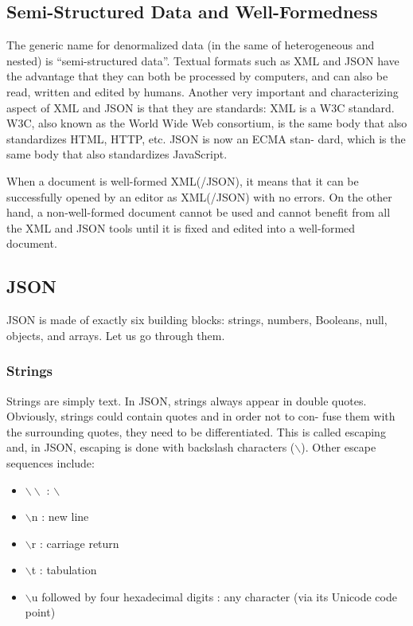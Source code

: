 \subsection{Semi-Structured Data and Well-Formedness}
The generic name for denormalized data (in the same of heterogeneous and nested) is “semi-structured data”. Textual formats such as XML and JSON have the advantage that they can both be processed by computers, and can also be read, written and edited by humans. Another very important and characterizing aspect of XML and JSON is that they are standards: XML is a W3C standard. W3C, also known as the World Wide Web consortium, is the same body that also standardizes HTML, HTTP, etc. JSON is now an ECMA stan- dard, which is the same body that also standardizes JavaScript.

When a document is well-formed XML(/JSON), it means that it can be successfully opened by an editor as XML(/JSON) with no errors. On the other hand, a non-well-formed document cannot be used and cannot benefit from all the XML and JSON tools until it is fixed and edited into a well-formed document.

\subsection{JSON}
JSON is made of exactly six building blocks: strings, numbers, Booleans, null, objects, and arrays. Let us go through them.

\subsubsection{Strings}
Strings are simply text. In JSON, strings always appear in double quotes. Obviously, strings could contain quotes and in order not to con- fuse them with the surrounding quotes, they need to be differentiated. This is called escaping and, in JSON, escaping is done with backslash characters ($\backslash$). Other escape sequences include:
\begin{itemize}
    \item $\backslash \backslash$ : $\backslash$
    \item $\backslash$n : new line
    \item $\backslash$r : carriage return
    \item $\backslash$t : tabulation
    \item $\backslash$u followed by four hexadecimal digits : any character (via its Unicode code point)
\end{itemize}

